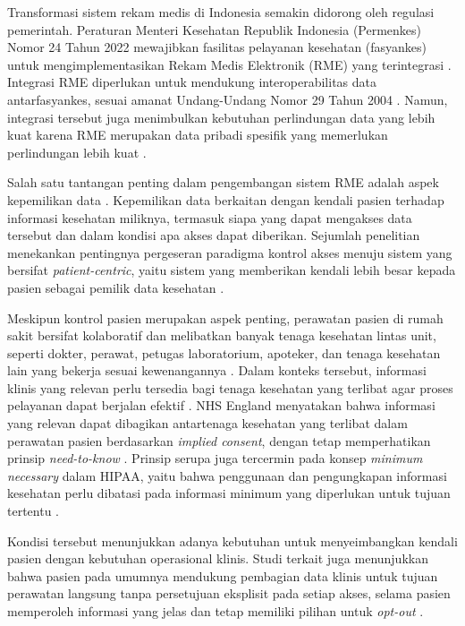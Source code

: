 \documentclass[bahasa, 12pt, a4paper, onecolumn, oneside, final]{report}
\begin{document}
Transformasi sistem rekam medis di Indonesia semakin didorong oleh regulasi pemerintah. Peraturan Menteri Kesehatan Republik Indonesia (Permenkes) Nomor 24 Tahun 2022 mewajibkan fasilitas pelayanan kesehatan (fasyankes) untuk mengimplementasikan Rekam Medis Elektronik (RME) yang terintegrasi \autocite{permenkes24_2022}. Integrasi RME diperlukan untuk mendukung interoperabilitas data antarfasyankes, sesuai amanat Undang-Undang Nomor 29 Tahun 2004 \autocite{uu_29_2004}. Namun, integrasi tersebut juga menimbulkan kebutuhan perlindungan data yang lebih kuat karena RME merupakan data pribadi spesifik yang memerlukan perlindungan lebih kuat \autocite{uu27-2022-pdp}.

Salah satu tantangan penting dalam pengembangan sistem RME adalah aspek kepemilikan data \autocite{liu2025accesscontrol}. Kepemilikan data berkaitan dengan kendali pasien terhadap informasi kesehatan miliknya, termasuk siapa yang dapat mengakses data tersebut dan dalam kondisi apa akses dapat diberikan. Sejumlah penelitian menekankan pentingnya pergeseran paradigma kontrol akses menuju sistem yang bersifat \textit{patient-centric}, yaitu sistem yang memberikan kendali lebih besar kepada pasien sebagai pemilik data kesehatan \autocite{patil2024blockchain,peng2023patientcentric}.

Meskipun kontrol pasien merupakan aspek penting, perawatan pasien di rumah sakit bersifat kolaboratif dan melibatkan banyak tenaga kesehatan lintas unit, seperti dokter, perawat, petugas laboratorium, apoteker, dan tenaga kesehatan lain yang bekerja sesuai kewenangannya \autocite{srinivas2023synergistic,kmk1128_2022}. Dalam konteks tersebut, informasi klinis yang relevan perlu tersedia bagi tenaga kesehatan yang terlibat agar proses pelayanan dapat berjalan efektif \autocite{srinivas2023synergistic}. NHS England menyatakan bahwa informasi yang relevan dapat dibagikan antartenaga kesehatan yang terlibat dalam perawatan pasien berdasarkan \textit{implied consent}, dengan tetap memperhatikan prinsip \textit{need-to-know} \autocite{nhs_consent_2025}. Prinsip serupa juga tercermin pada konsep \textit{minimum necessary} dalam HIPAA, yaitu bahwa penggunaan dan pengungkapan informasi kesehatan perlu dibatasi pada informasi minimum yang diperlukan untuk tujuan tertentu \autocite{HHS_MinimumNecessaryPDF}.

Kondisi tersebut menunjukkan adanya kebutuhan untuk menyeimbangkan kendali pasien dengan kebutuhan operasional klinis. Studi terkait juga menunjukkan bahwa pasien pada umumnya mendukung pembagian data klinis untuk tujuan perawatan langsung tanpa persetujuan eksplisit pada setiap akses, selama pasien memperoleh informasi yang jelas dan tetap memiliki pilihan untuk \textit{opt-out} \autocite{jones2022public}.
\end{document}
